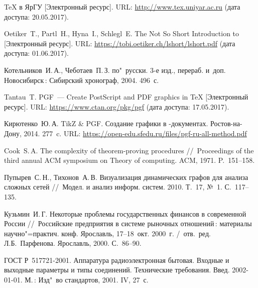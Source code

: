 \documentclass[a4paper,12pt]{diplom}
\begin{document}
\renewcommand{\bibname}{Список литературы} 
\begin{thebibliography}{9}



	TeX в ЯрГУ [Электронный ресурс].
	URL: \url{http://www.tex.uniyar.ac.ru}
	(дата доступа: 20.05.2017).

	Oetiker~T., Partl~H., Hyna~I., Schlegl~E. 
	The Not So Short Introduction to {\LaTeXe} [Электронный ресурс].
	URL: \url{https://tobi.oetiker.ch/lshort/lshort.pdf}
	(дата доступа: 01.06.2017).


	Котельников~И.\,А., Чеботаев~П.\,З.
	\LaTeXe{} по"~русски. 3-е изд., перераб. и~доп.
	Новосибирск\,: Сибирский хронограф, 2004. 496~с.

	Tantau~T.
	PGF~--- Create PostScript and PDF graphics in {\TeX} [Электронный ресурс].
	URL: \url{https://www.ctan.org/pkg/pgf}
	(дата доступа: 17.05.2017).

	Кирютенко~Ю.\,А.
	TikZ \& PGF. Создание графики в \LaTeXe-документах. Ростов-на-Дону, 2014. 277~c.
	URL: \url{https://open-edu.sfedu.ru/files/pgf-ru-all-method.pdf}


	Cook~S.\,A. 
	The complexity of theorem-proving procedures
	//~Proceedings of the third annual ACM symposium on Theory of computing. 
	ACM, 1971. P.~151--158.

	Пупырев~С.\,Н., Тихонов~А.\,В.
	Визуализация динамических графов для анализа сложных сетей
	//~Модел. и анализ информ. систем. 
	2010. Т.~17, №~1. С.~117--135.

	Кузьмин~И.\,Г. 
	Некоторые проблемы государственных финансов в современной России
	//~Российские предприятия в системе рыночных отношений\,: материалы научно"=практич. конф. Ярославль, 17--18~окт. 2000~г. /~отв.~ред. Л.Б.~Парфенова.  Ярославль, 2000.  С.~86--90.
	
	ГОСТ Р~517721-2001.
	Аппаратура радиоэлектронная бытовая. Входные и выходные параметры и типы соединений. Технические требования.  Введ. 2002-01-01. М.\,: Изд"~во стандартов, 2001. IV, 27~с.
	
\end{thebibliography}
\end{document}
